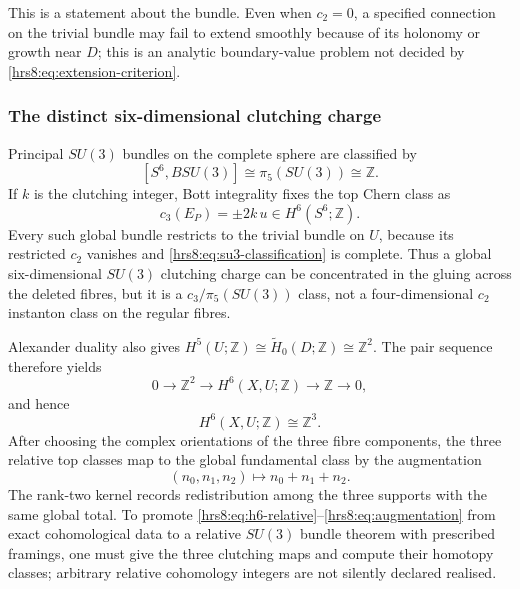 This is a statement about the bundle.  Even when $c_2=0$, a specified
connection on the trivial bundle may fail to extend smoothly because of its
holonomy or growth near $D$; this is an analytic boundary-value problem not
decided by \eqref{hrs8:eq:extension-criterion}.

\subsubsection{The distinct six-dimensional clutching charge}
\label{hrs8:subsubsec:c3-clutching}

Principal $SU(3)$ bundles on the complete sphere are classified by
\[
 [S^6,BSU(3)]\cong\pi_5(SU(3))\cong\mathbb Z.
\]
If $k$ is the clutching integer, Bott integrality fixes the top Chern class as
\begin{equation}
 c_3(E_P)=\pm2k\,u\in H^6(S^6;\mathbb Z).
 \label{hrs8:eq:c3-clutching}
\end{equation}
Every such global bundle restricts to the trivial bundle on $U$, because its
restricted $c_2$ vanishes and \eqref{hrs8:eq:su3-classification} is complete.
Thus a global six-dimensional $SU(3)$ clutching charge can be concentrated in
the gluing across the deleted fibres, but it is a
$c_3/\pi_5(SU(3))$ class, not a four-dimensional $c_2$ instanton class on the
regular fibres.

Alexander duality also gives
$H^5(U;\mathbb Z)\cong\widetilde H_0(D;\mathbb Z)\cong\mathbb Z^2$.
The pair sequence therefore yields
\[
 0\longrightarrow\mathbb Z^2
 \longrightarrow H^6(X,U;\mathbb Z)
 \longrightarrow\mathbb Z
 \longrightarrow0,
\]
and hence
\begin{equation}
 H^6(X,U;\mathbb Z)\cong\mathbb Z^3.
 \label{hrs8:eq:h6-relative}
\end{equation}
After choosing the complex orientations of the three fibre components, the
three relative top classes map to the global fundamental class by the
augmentation
\begin{equation}
 (n_0,n_1,n_2)\longmapsto n_0+n_1+n_2.
 \label{hrs8:eq:augmentation}
\end{equation}
The rank-two kernel records redistribution among the three supports with the
same global total.  To promote
\eqref{hrs8:eq:h6-relative}--\eqref{hrs8:eq:augmentation} from exact
cohomological data to a relative $SU(3)$ bundle theorem with prescribed framings,
one must give the three clutching maps and compute their homotopy classes;
arbitrary relative cohomology integers are not silently declared realised.

